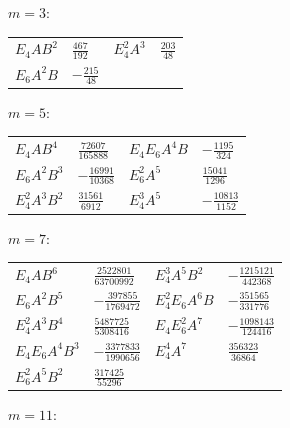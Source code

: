 \noindent$m=3$:\nopagebreak\\[2pt]
{\small\begin{tabular}{@{}l@{\ \ }l@{\qquad}l@{\ \ }l@{}}
$E_4 A B^{2}$ & $\tfrac{467}{192}$ & $E_4^{2} A^{3}$ & $\tfrac{203}{48}$ \\
$E_6 A^{2} B$ & $-\tfrac{215}{48}$ & & \\
\end{tabular}}\par\medskip
\noindent$m=5$:\nopagebreak\\[2pt]
{\small\begin{tabular}{@{}l@{\ \ }l@{\qquad}l@{\ \ }l@{}}
$E_4 A B^{4}$ & $\tfrac{72607}{165888}$ & $E_4 E_6 A^{4} B$ & $-\tfrac{1195}{324}$ \\
$E_6 A^{2} B^{3}$ & $-\tfrac{16991}{10368}$ & $E_6^{2} A^{5}$ & $\tfrac{15041}{1296}$ \\
$E_4^{2} A^{3} B^{2}$ & $\tfrac{31561}{6912}$ & $E_4^{3} A^{5}$ & $-\tfrac{10813}{1152}$ \\
\end{tabular}}\par\medskip
\noindent$m=7$:\nopagebreak\\[2pt]
{\small\begin{tabular}{@{}l@{\ \ }l@{\qquad}l@{\ \ }l@{}}
$E_4 A B^{6}$ & $\tfrac{2522801}{63700992}$ & $E_4^{3} A^{5} B^{2}$ & $-\tfrac{1215121}{442368}$ \\
$E_6 A^{2} B^{5}$ & $-\tfrac{397855}{1769472}$ & $E_4^{2} E_6 A^{6} B$ & $-\tfrac{351565}{331776}$ \\
$E_4^{2} A^{3} B^{4}$ & $\tfrac{5487725}{5308416}$ & $E_4 E_6^{2} A^{7}$ & $-\tfrac{1098143}{124416}$ \\
$E_4 E_6 A^{4} B^{3}$ & $-\tfrac{3377833}{1990656}$ & $E_4^{4} A^{7}$ & $\tfrac{356323}{36864}$ \\
$E_6^{2} A^{5} B^{2}$ & $\tfrac{317425}{55296}$ & & \\
\end{tabular}}\par\medskip
\noindent$m=11$:\nopagebreak\\[2pt]
